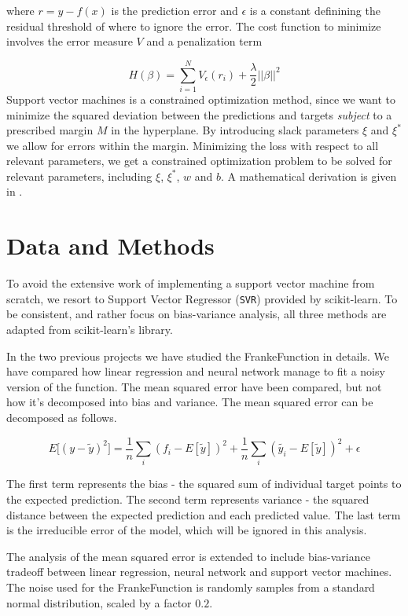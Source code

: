 \documentclass[a4paper]{article}
\def\code#1{\texttt{#1}}
\begin{document}
	where $r = y - f(x)$ is the prediction error and $\epsilon$ is a constant definining the residual threshold of where to ignore the error. The cost function to minimize involves the error measure $V$ and a penalization term
	
	\[ H(\beta) = \sum_{i=1}^N V_{\epsilon}(r_i) + \frac{\lambda}{2} ||\beta||^2 \]
	Support vector machines is a constrained optimization method, since we want to minimize the squared deviation between the predictions and targets \textit{subject} to a prescribed margin $M$ in the hyperplane. By introducing slack parameters $\xi$ and $\xi^*$ we allow for errors within the margin. Minimizing the loss with respect to all relevant parameters, we get a constrained optimization problem to be solved for relevant parameters, including $\xi$, $\xi^*$, $w$ and $b$. A mathematical derivation is given in \cite{Hastie2009}.
	
	
	
	\section{Data and Methods}
	To avoid the extensive work of implementing a support vector machine from scratch, we resort to Support Vector Regressor (\code{SVR}) provided by scikit-learn. To be consistent, and rather focus on bias-variance analysis, all three methods are adapted from scikit-learn's library.
	
	In the two previous projects we have studied the FrankeFunction in details. We have compared how linear regression and neural network manage to fit a noisy version of the function. The mean squared error have been compared, but not how it's decomposed into bias and variance. The mean squared error can be decomposed as follows.
	
	\[ E\big[(y - \tilde{y})^2\big] = \frac{1}{n}\sum_i (f_i - E[\tilde{y}])^2 + \frac{1}{n}\sum_i (\tilde{y_i} - E[\tilde{y}])^2 + \epsilon \]
	
	The first term represents the bias - the squared sum of individual target points to the expected prediction. The second term represents variance - the squared distance between the expected prediction and each predicted value. The last term is the irreducible error of the model, which will be ignored in this analysis.
	
	The analysis of the mean squared error is extended to include bias-variance tradeoff between linear regression, neural network and support vector machines. The noise used for the FrankeFunction is randomly samples from a standard normal distribution, scaled by a factor $0.2$. \\
	
\end{document}
